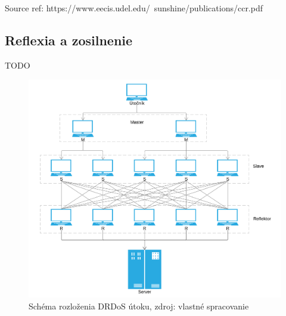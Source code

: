 \documentclass[
  printed, %
  table,   %
  lof,     %
  lot,     %
]{fithesis3}
\begin{document}
Source ref: https://www.eecis.udel.edu/~sunshine/publications/ccr.pdf

\subsection{Reflexia a zosilnenie}
TODO

\begin{figure}[h]
  \centering
    \includegraphics[width=\textwidth]{images/drdos.png}
  \caption{Schéma rozloženia DRDoS útoku, zdroj: vlastné spracovanie}
  \label{fig:cs-basic}
\end{figure}

\end{document}
